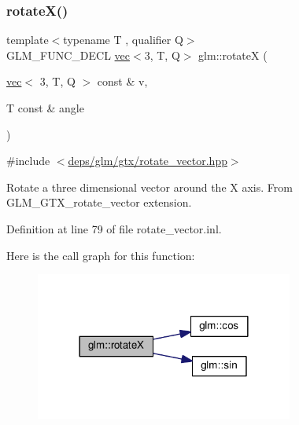 \subsubsection{\texorpdfstring{rotate\+X()}{rotateX()}\hspace{0.1cm}{\footnotesize\ttfamily [1/2]}}
{\footnotesize\ttfamily template$<$typename T , qualifier Q$>$ \\
G\+L\+M\+\_\+\+F\+U\+N\+C\+\_\+\+D\+E\+CL \hyperlink{structglm_1_1vec}{vec}$<$3, T, Q$>$ glm\+::rotateX (\begin{DoxyParamCaption}\item[{\hyperlink{structglm_1_1vec}{vec}$<$ 3, T, Q $>$ const \&}]{v,  }\item[{T const \&}]{angle }\end{DoxyParamCaption})}



{\ttfamily \#include $<$\hyperlink{rotate__vector_8hpp}{deps/glm/gtx/rotate\+\_\+vector.\+hpp}$>$}

Rotate a three dimensional vector around the X axis. From G\+L\+M\+\_\+\+G\+T\+X\+\_\+rotate\+\_\+vector extension. 

Definition at line 79 of file rotate\+\_\+vector.\+inl.

Here is the call graph for this function\+:
\nopagebreak
\begin{figure}[H]
\begin{center}
\leavevmode
\includegraphics[width=240pt]{df/d02/group__gtx__rotate__vector_ga059fdbdba4cca35cdff172a9d0d0afc9_cgraph}
\end{center}
\end{figure}
\mbox{\label{group__gtx__rotate__vector_ga4333b1ea8ebf1bd52bc3801a7617398a}} 
